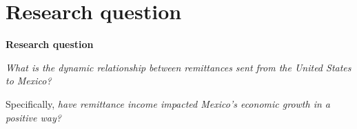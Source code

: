 \section{Research question}
\textbf{Research question}\par
\textit{What is the dynamic relationship between remittances sent from the United States to Mexico?}\par Specifically, \textit{have remittance income impacted Mexico's economic growth in a positive way?}